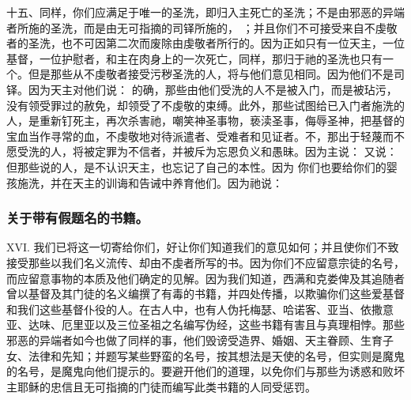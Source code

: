 十五、同样，你们应满足于唯一的圣洗，即归入主死亡的圣洗；不是由邪恶的异端者所施的圣洗，而是由无可指摘的司铎所施的， ；并且你们不可接受来自不虔敬者的圣洗，也不可因第二次而废除由虔敬者所行的。因为正如只有一位天主，一位基督，一位护慰者，和主在肉身上的一次死亡，同样，那归于祂的圣洗也只有一个。但是那些从不虔敬者接受污秽圣洗的人，将与他们意见相同。因为他们不是司铎。因为天主对他们说： 的确，那些由他们受洗的人不是被入门，而是被玷污，没有领受罪过的赦免，却领受了不虔敬的束缚。此外，那些试图给已入门者施洗的人，是重新钉死主，再次杀害祂，嘲笑神圣事物，亵渎圣事，侮辱圣神，把基督的宝血当作寻常的血，不虔敬地对待派遣者、受难者和见证者。不，那出于轻蔑而不愿受洗的人，将被定罪为不信者，并被斥为忘恩负义和愚昧。因为主说：  又说：  但那些说的人，是不认识天主，也忘记了自己的本性。因为 你们也要给你们的婴孩施洗，并在天主的训诲和告诫中养育他们。因为祂说： \par


\subsubsection{关于带有假题名的书籍。}

XVI. 我们已将这一切寄给你们，好让你们知道我们的意见如何；并且使你们不致接受那些以我们名义流传、却由不虔者所写的书。因为你们不应留意宗徒的名号，而应留意事物的本质及他们确定的见解。因为我们知道，西满和克娄俾及其追随者曾以基督及其门徒的名义编撰了有毒的书籍，并四处传播，以欺骗你们这些爱基督和我们这些基督仆役的人。在古人中，也有人伪托梅瑟、哈诺客、亚当、依撒意亚、达味、厄里亚以及三位圣祖之名编写伪经，这些书籍有害且与真理相悖。那些邪恶的异端者如今也做了同样的事，他们毁谤受造界、婚姻、天主眷顾、生育子女、法律和先知；并题写某些野蛮的名号，按其想法是天使的名号，但实则是魔鬼的名号，是魔鬼向他们提示的。要避开他们的道理，以免你们与那些为诱惑和败坏主耶稣的忠信且无可指摘的门徒而编写此类书籍的人同受惩罚。\par


